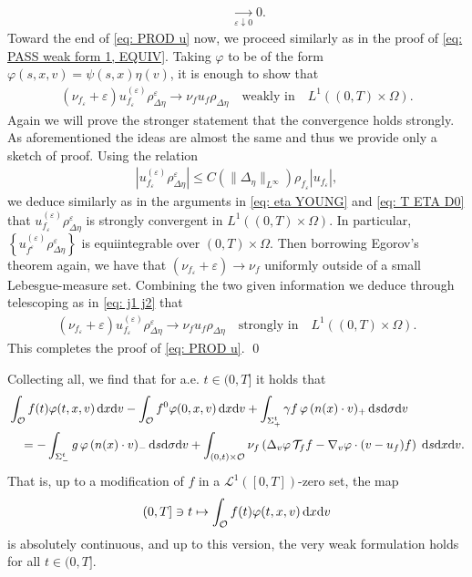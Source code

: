 \documentclass[10pt, reqno]{amsart}
\theoremstyle{plain}
\theoremstyle{definition}
\theoremstyle{remark}
\renewenvironment{proof}[1][\proofname]{\noindent{\scshape #1.\quad}}{\qed}
\numberwithin{equation}{section}
\newcommand{\calO}{\mathcal O}
\newcommand{\calT}{\mathcal T}
\newcommand{\scrL}{\mathscr L}
\newcommand{\ve}{\varepsilon}
\newcommand{\dx}{\textnormal{d}x}
\newcommand{\dv}{\textnormal{d}v}
\newcommand{\ds}{\textnormal{d}s}
\newcommand{\tnd}{\textnormal{d}}
\newcommand{\lt}{\left}
\newcommand{\rt}{\right}
\begin{document}
\begin{proof}
\begin{align*}
    &\quad\xrightarrow[\ve\downarrow 0]{} 0.
\end{align*}
Toward the end of \eqref{eq: PROD u} now, we proceed similarly as in the proof of \eqref{eq: PASS weak form 1, EQUIV}. Taking $\varphi$ to be of the form $\varphi(s,x,v) = \psi(s,x) \eta(v)$, it is enough to show that
\begin{align*}
    (\nu_{f_\ve} + \ve) u_{f_\ve}^{(\ve)} \rho_{\Delta\eta}^\ve \to \nu_f u_f \rho_{\Delta\eta} \quad \text{weakly in}\quad L^1((0,T)\times\Omega).
\end{align*}
Again we will prove the stronger statement that the convergence holds strongly. As aforementioned the ideas are almost the same and thus we provide only a sketch of proof. Using the relation
\begin{align*}
    |u_{f_\ve}^{(\ve)}\rho_{\Delta\eta}^\ve | \le C(\|\Delta_\eta\|_{L^\infty}) \rho_{f_\ve} |u_{f_\ve}|,
\end{align*}
we deduce similarly as in the arguments in \eqref{eq: eta YOUNG} and \eqref{eq: T ETA D0} that $u_{f_\ve}^{(\ve)} \rho_{\Delta\eta}^\ve$ is strongly convergent in $L^1((0,T)\times \Omega)$. In particular, $\lt\{u_{f^{\ve}}^{(\ve)} \rho_{\Delta\eta}^\ve\rt\}$ is equiintegrable over $(0,T)\times \Omega$. Then borrowing Egorov's theorem again, we have that $(\nu_{f_\ve}+\ve) \to \nu_f$ uniformly outside of a small Lebesgue-measure set. Combining the two given information we deduce through telescoping as in \eqref{eq: j1 j2} that
\begin{align*}
    (\nu_{f_\ve} + \ve) u_{f_\ve}^{(\ve)} \rho_{\Delta\eta}^\ve \to \nu_f u_f \rho_{\Delta\eta} \quad \text{strongly in}\quad L^1((0,T)\times\Omega).
\end{align*}
This completes the proof of \eqref{eq: PROD u}.
\end{proof}


Collecting all, we find that for a.e. $t\in (0,T]$ it holds that
\begin{align*}
    &\int_{\calO} f(t) \varphi(t,x,v) \,\dx\dv - \int_{\calO} f^0 \varphi(0,x,v)\,\dx\dv + \int_{\Sigma_+^t} \gamma f \, \varphi \, (n(x)\cdot v)_+ \,\ds\tnd\sigma\dv\\
    &\quad= - \int_{\Sigma_-^t} g \, \varphi \, (n(x)\cdot v)_- \,\ds\tnd\sigma\dv  + \int_{(0,t)\times \calO} \nu_f \lt( \Delta_v \varphi \, \calT_f f - \nabla_v\varphi \cdot (v - u_f) f \rt) \; \ds\dx\dv.
\end{align*}
That is, up to a modification of $f$ in a $\scrL^1([0,T])$-zero set, the map
\begin{align*}
    (0,T] \ni t \mapsto \int_{\calO} f(t) \varphi(t,x,v) \,\dx\dv
\end{align*}
is absolutely continuous, and up to this version, the very weak formulation holds for all $t\in (0,T]$.
%
%
%
%
%
%
\end{document}
